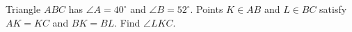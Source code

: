Triangle $ABC$ has $\angle A=40^\circ$ and $\angle B=52^\circ$. Points $K\in AB$ and $L\in BC$ satisfy $AK=KC$ and $BK=BL$. Find $\angle LKC$.
